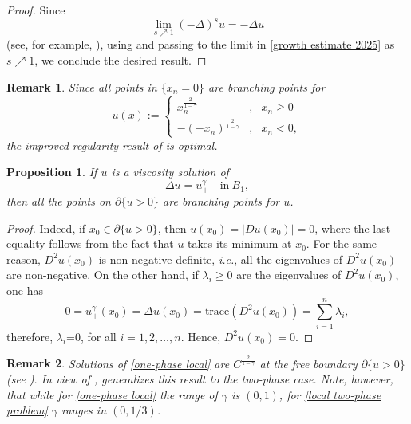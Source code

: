 \documentclass[11pt,reqno]{amsart}
\newtheorem{proposition}{Proposition}
\newtheorem{remark}{Remark}
\numberwithin{equation}{section}
\numberwithin{theorem}{section}
\numberwithin{lemma}{section}
\numberwithin{corollary}{section}
\numberwithin{remark}{section}
\numberwithin{proposition}{section}
\numberwithin{definition}{section}
\begin{document}
\begin{proof}
Since 
$$
\lim_{s\nearrow 1}(-\Delta)^su=-\Delta u
$$
(see, for example, \cite[Lemma 4.1]{T24}), using  and passing to the limit in \eqref{growth estimate 2025} as $s\nearrow 1$, we conclude the desired result.
\end{proof}

\begin{remark}
    Since all points in $\{x_n=0\}$ are branching points for
\[
u(x):=\left\{
\begin{array}{rcl}
x_n^{\frac{2}{1-\gamma}} & , & x_n\geq 0 \\
 -(-x_n)^{\frac{2}{1-\gamma}}& , & x_n<0,
\end{array}
\right.
\]
the improved regularity result of  is optimal.
\end{remark}

\begin{proposition}\label{one-phase branching points}
    If $u$ is a viscosity solution of 
    \begin{equation}\label{one-phase local}
        \Delta u=u_+^\gamma \quad \textrm{in} \ B_1,
    \end{equation}
    then all the points on $\partial\{u>0\}$ are branching points for $u$.
\end{proposition}

\begin{proof}
    Indeed, if $x_0\in\partial\{u>0\}$, then $u(x_0)=|Du(x_0)|=0$, where the last equality follows from the fact that $u$ takes its minimum at $x_0$. For the same reason, $D^2u(x_0)$ is non-negative definite, \textit{i.e.}, all the eigenvalues of $D^2u(x_0)$ are non-negative. On the other hand, if $\lambda_i\ge0$ are the eigenvalues of $D^2u(x_0)$, one has
    $$    0=u_+^\gamma(x_0)=\Delta u(x_0)=\textrm{trace}(D^2u(x_0))=\sum_{i=1}^n\lambda_i,
    $$
    therefore, $\lambda_i$=0, for all $i=1,2,\ldots,n$. Hence, $D^2u(x_0)=0$.
\end{proof}

\begin{remark}\label{remark on one-phase problem}
Solutions of \eqref{one-phase local} are $C^{\frac{2}{1-\gamma}}$ at the free boundary $\partial\{u>0\}$ (see \cite[Theorem 2]{T16}). In view of ,  generalizes this result to the two-phase case. Note, however, that while for \eqref{one-phase local} the range of $\gamma$ is $(0,1)$, for \eqref{local two-phase problem} $\gamma$ ranges in $(0,1/3)$.
\end{remark}
\end{document}
